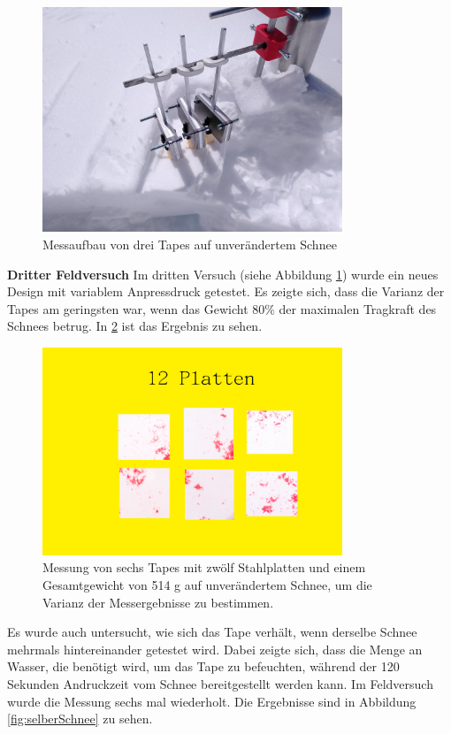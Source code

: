 \begin{figure}[H]
    \centering
    \includegraphics[width=0.8\textwidth]{Bilder/aufbauTitlis.jpeg}
    \caption{Messaufbau von drei Tapes auf unverändertem Schnee} 
    \label{fig:aufbauTitlis}
\end{figure}
\textbf{Dritter Feldversuch}
Im dritten Versuch (siehe Abbildung \ref{fig:aufbauTitlis}) wurde ein neues Design mit variablem Anpressdruck getestet. Es zeigte sich, dass die Varianz der Tapes am geringsten war, wenn das Gewicht 80\% der maximalen Tragkraft des Schnees betrug. In \ref{fig:12Palt} ist das Ergebnis zu sehen.

\begin{figure}[H]
    \centering
    \includegraphics[width=0.8\textwidth]{Bilder/12Platten.png}
    \caption{Messung von sechs Tapes mit  zwölf Stahlplatten und einem Gesamtgewicht von 514 g auf unverändertem Schnee, um die Varianz der Messergebnisse zu bestimmen.} 
    \label{fig:12Palt}
\end{figure}

\newpage
Es wurde auch untersucht, wie sich das Tape verhält, wenn derselbe Schnee mehrmals hintereinander getestet wird. Dabei zeigte sich, dass die Menge an Wasser, die benötigt wird, um das Tape zu befeuchten, während der 120 Sekunden Andruckzeit vom Schnee bereitgestellt werden kann. Im Feldversuch wurde die Messung sechs mal wiederholt. Die Ergebnisse sind in Abbildung \ref{fig:selberSchnee} zu sehen.


